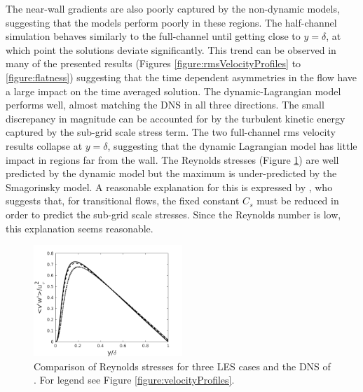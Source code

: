 \documentclass[12pt,oneside,a4paper]{article}
\begin{document}
The near-wall gradients are also poorly captured by the non-dynamic models, suggesting that the models perform poorly in these regions. The half-channel simulation behaves similarly to the full-channel until getting close to $y=\delta$, at which point the solutions deviate significantly. This trend can be observed in many of the presented results (Figures \ref{figure:rmsVelocityProfiles} to \ref{figure:flatness}) suggesting that the time dependent asymmetries in the flow have a large impact on the time averaged solution. The dynamic-Lagrangian model performs well, almost matching the DNS in all three directions. The small discrepancy in magnitude can be accounted for by the turbulent kinetic energy captured by the sub-grid scale stress term. The two full-channel rms velocity results collapse at $y=\delta$, suggesting that the dynamic Lagrangian model has little impact in regions far from the wall. The Reynolds stresses (Figure \ref{figure:reynoldsStress}) are well predicted by the dynamic model but the maximum is under-predicted by the Smagorinsky model. A reasonable explanation for this is expressed by \cite{pope2001}, who suggests that, for transitional flows, the fixed constant $C_s$ must be reduced in order to predict the sub-grid scale stresses. Since the Reynolds number is low, this explanation seems reasonable.
\begin{figure}[!t]
\centering
\includegraphics[width=0.5\textwidth]{images/Reynolds_Stress.png}
\caption{Comparison of Reynolds stresses for three LES cases and the DNS of \cite{vreman2014}. For legend see Figure \ref{figure:velocityProfiles}.}
\label{figure:reynoldsStress}
\end{figure}
\end{document}
